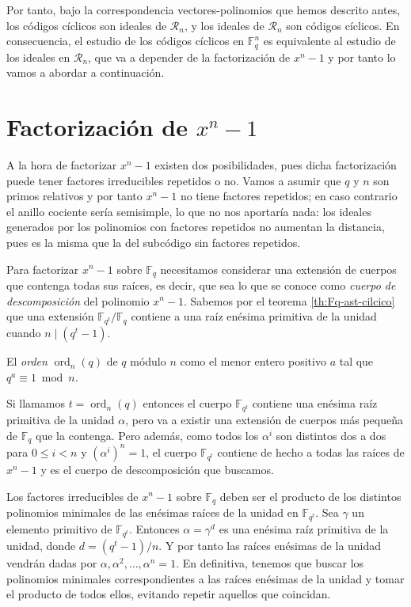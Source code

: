 Por tanto, bajo la correspondencia vectores-polinomios que hemos descrito antes, los códigos cíclicos son ideales de \(\mathcal R_n\), y los ideales de \(\mathcal R_n\) son códigos cíclicos.
En consecuencia, el estudio de los códigos cíclicos en \(\mathbb F_q^n\) es equivalente al estudio de los ideales en \(\mathcal R_n\), que va a depender de la factorización de \(x^n-1\) y por tanto lo vamos a abordar a continuación.

\section{Factorización de \texorpdfstring{\(x^n -1\)}{xn - 1}}

\label{sec:factorizacion-xn-1}

A la hora de factorizar \(x^n -1\) existen dos posibilidades, pues dicha factorización puede tener factores irreducibles repetidos o no.
Vamos a asumir que \(q\) y \(n\) son primos relativos y por tanto \(x^n - 1\) no tiene factores repetidos; en caso contrario el anillo cociente sería semisimple, lo que no nos aportaría nada: los ideales generados por los polinomios con factores repetidos no aumentan la distancia, pues es la misma que la del subcódigo sin factores repetidos.

Para factorizar \(x^n - 1\) sobre \(\mathbb F_q\) necesitamos considerar una extensión de cuerpos que contenga todas sus raíces, es decir, que sea lo que se conoce como \emph{cuerpo de descomposición} del polinomio \(x^n - 1\).
Sabemos por el teorema \ref{th:Fq-ast-cilcico} que una extensión \(\mathbb F_{q^t}/\mathbb F_q\) contiene a una raíz enésima primitiva de la unidad cuando \(n \mid (q^t - 1)\).

\begin{definition}
  El \textit{orden} \(\operatorname{ord}_n(q)\) de \(q\) módulo \(n\) como el menor entero positivo \(a\) tal que \(q^{a} \equiv 1 \bmod n\).
\end{definition}

Si llamamos \(t = \operatorname{ord}_n(q)\) entonces el cuerpo \(\mathbb F_{q^t}\) contiene una enésima raíz primitiva de la unidad \(\alpha\), pero va a existir una extensión de cuerpos más pequeña de \(\mathbb F_q\) que la contenga.
Pero además, como todos los \(\alpha^{i}\) son distintos dos a dos para \(0 \leq i < n\) y \((\alpha^{i})^n = 1\), el cuerpo \(\mathbb F_{q^t}\) contiene de hecho a todas las raíces de \(x^n - 1\) y es el cuerpo de descomposición que buscamos.

Los factores irreducibles de \(x^n - 1\) sobre \(\mathbb F_q\) deben ser el producto de los distintos polinomios minimales de las enésimas raíces de la unidad en \(\mathbb F_{q^t}\).
Sea \(\gamma\) un elemento primitivo de \(\mathbb F_{q^t}\).
Entonces \(\alpha = \gamma^d\) es una enésima raíz primitiva de la unidad, donde \(d = (q^t - 1)/n\).
Y por tanto las raíces enésimas de la unidad vendrán dadas por \(\alpha, \alpha^2, \dots, \alpha^n = 1\).
En definitiva, tenemos que buscar los polinomios minimales correspondientes a las raíces enésimas de la unidad y tomar el producto de todos ellos, evitando repetir aquellos que coincidan.

